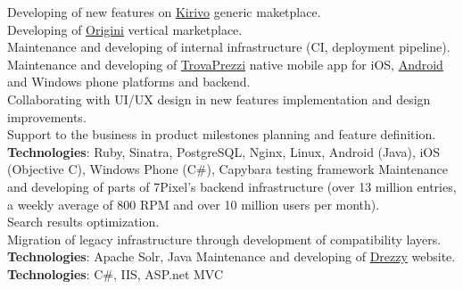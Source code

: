 \documentclass[letterpaper]{twentysecondcv} %
\begin{document}
\begin{twenty} %
	{Developing of new features on \href{http://www.kirivo.it}{Kirivo} generic maketplace.\\
	Developing of \href{http://www.origini.it}{Origini} vertical marketplace.\\
Maintenance and developing of internal infrastructure (CI, deployment pipeline).\\
Maintenance and developing of \href{http://www.trovaprezzi.it}{TrovaPrezzi} native mobile app for iOS, \href{https://play.google.com/store/apps/details?id=it.trovaprezzi.android}{Android}
and Windows phone platforms and backend.\\
Collaborating with UI/UX design in new features implementation and design improvements.\\
Support to the business in product milestones planning and feature definition.\\
\textbf{Technologies}: Ruby, Sinatra, PostgreSQL, Nginx, Linux, Android (Java), iOS (Objective C), Windows
Phone (C\#), Capybara testing framework}
{Maintenance and developing of parts of 7Pixel's backend infrastructure (over 13 million entries, a weekly average of 800 RPM and over 10 million users per month).\\
Search results optimization.\\
Migration of legacy infrastructure through development of compatibility layers.\\
\textbf{Technologies}: Apache Solr, Java}
{Maintenance and developing of \href{http://www.drezzy.id}{Drezzy} website.\\
\textbf{Technologies}: C\#, IIS, ASP.net MVC}
\end{twenty}
\end{document}
